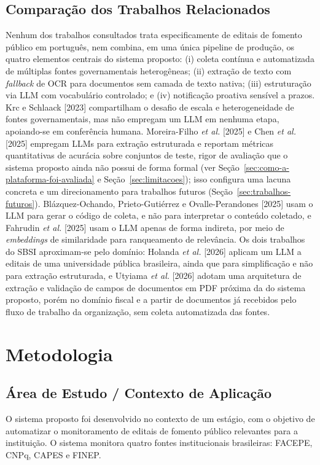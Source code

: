 \documentclass[12pt]{article}
\begin{document}
  \subsection{Comparação dos Trabalhos Relacionados}\label{sec:comparacao-dos-trabalhos-relacionados}
  Nenhum dos trabalhos consultados trata especificamente de editais de fomento público em português, nem combina, em uma única pipeline de produção, os quatro elementos centrais do sistema proposto: (i) coleta contínua e automatizada de múltiplas fontes governamentais heterogêneas; (ii) extração de texto com \emph{fallback} de OCR para documentos sem camada de texto nativa; (iii) estruturação via LLM com vocabulário controlado; e (iv) notificação proativa sensível a prazos. Krc e Schlaack [2023] compartilham o desafio de escala e heterogeneidade de fontes governamentais, mas não empregam um LLM em nenhuma etapa, apoiando-se em conferência humana. Moreira-Filho \emph{et al.} [2025] e Chen \emph{et al.} [2025] empregam LLMs para extração estruturada e reportam métricas quantitativas de acurácia sobre conjuntos de teste, rigor de avaliação que o sistema proposto ainda não possui de forma formal (ver Seção~\ref{sec:como-a-plataforma-foi-avaliada} e Seção~\ref{sec:limitacoes}); isso configura uma lacuna concreta e um direcionamento para trabalhos futuros (Seção~\ref{sec:trabalhos-futuros}). Blázquez-Ochando, Prieto-Gutiérrez e Ovalle-Perandones [2025] usam o LLM para gerar o código de coleta, e não para interpretar o conteúdo coletado, e Fahrudin \emph{et al.} [2025] usam o LLM apenas de forma indireta, por meio de \emph{embeddings} de similaridade para ranqueamento de relevância. Os dois trabalhos do SBSI aproximam-se pelo domínio: Holanda \emph{et al.} [2026] aplicam um LLM a editais de uma universidade pública brasileira, ainda que para simplificação e não para extração estruturada, e Utyiama \emph{et al.} [2026] adotam uma arquitetura de extração e validação de campos de documentos em PDF próxima da do sistema proposto, porém no domínio fiscal e a partir de documentos já recebidos pelo fluxo de trabalho da organização, sem coleta automatizada das fontes.

  \section{Metodologia}\label{sec:metodologia}

  \subsection{Área de Estudo / Contexto de Aplicação}
  O sistema proposto foi desenvolvido no contexto de um estágio, com o objetivo de automatizar o monitoramento de editais de fomento público relevantes para a instituição. O sistema monitora quatro fontes institucionais brasileiras: FACEPE, CNPq, CAPES e FINEP.
\end{document}
